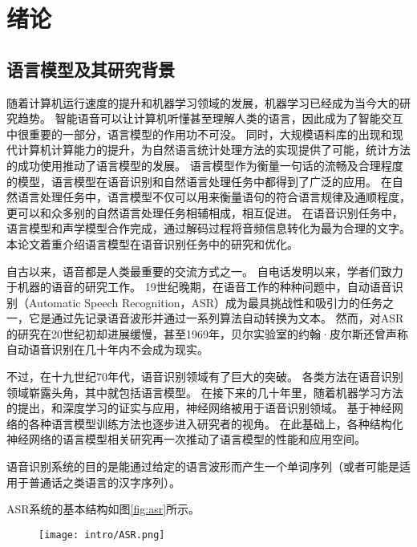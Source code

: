 

\chapter{绪论}
\label{chap:intro}
\section{语言模型及其研究背景}
随着计算机运行速度的提升和机器学习领域的发展，机器学习已经成为当今大的研究趋势。
智能语音可以让计算机听懂甚至理解人类的语言，因此成为了智能交互中很重要的一部分，语言模型的作用功不可没。
同时，大规模语料库的出现和现代计算机计算能力的提升，为自然语言统计处理方法的实现提供了可能，统计方法的成功使用推动了语言模型的发展。
语言模型作为衡量一句话的流畅及合理程度的模型，语言模型在语音识别和自然语言处理任务中都得到了广泛的应用。
在自然语言处理任务中，语言模型不仅可以用来衡量语句的符合语言规律及通顺程度，更可以和众多别的自然语言处理任务相辅相成，相互促进。
在语音识别任务中，语言模型和声学模型合作完成，通过解码过程将音频信息转化为最为合理的文字。
本论文着重介绍语言模型在语音识别任务中的研究和优化。



自古以来，语音都是人类最重要的交流方式之一。
自电话发明以来，学者们致力于机器的语音的研究工作。
19世纪晚期，在语音工作的种种问题中，自动语音识别（Automatic Speech Recognition，ASR）成为最具挑战性和吸引力的任务之一，它是通过先记录语音波形并通过一系列算法自动转换为文本。
然而，对ASR的研究在20世纪初却进展缓慢，甚至1969年，贝尔实验室的约翰·皮尔斯还曾声称自动语音识别在几十年内不会成为现实。


不过，在十九世纪70年代，语音识别领域有了巨大的突破。
各类方法在语音识别领域崭露头角，其中就包括语言模型。
在接下来的几十年里，随着机器学习方法的提出，和深度学习的证实与应用，神经网络被用于语音识别领域。
基于神经网络的各种语言模型训练方法也逐步进入研究者的视角。
在此基础上，各种结构化神经网络的语言模型相关研究再一次推动了语言模型的性能和应用空间。


语音识别系统的目的是能通过给定的语言波形而产生一个单词序列（或者可能是适用于普通话之类语言的汉字序列）。


ASR系统的基本结构如图\ref{fig:asr}所示\cite{mohamed2012acoustic}。



\begin{figure}[!htbp]
  \centering
  \begin{minipage}[b]{0.6\textwidth}
    \captionstyle{\centering}
    \centering
    \texttt{[image: intro/ASR.png]}
  \end{minipage}     
\end{figure}

